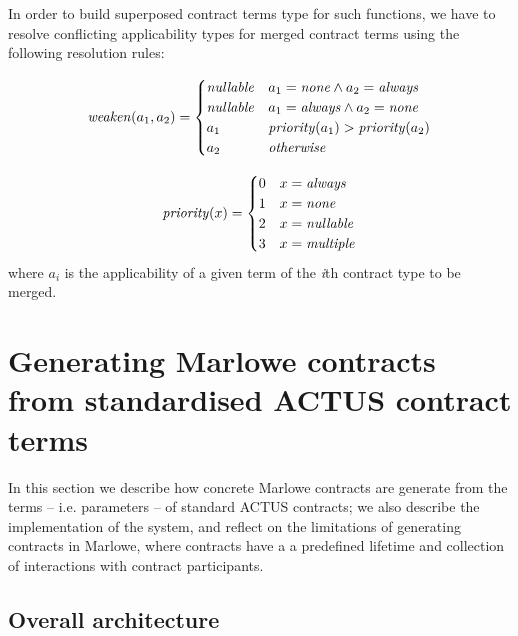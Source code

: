 \documentclass[runningheads]{llncs}
\newcommand{\ident}[1]{\mbox{\emph{#1}}}
\begin{document}
In order to build superposed contract terms type for such functions,
we have to resolve conflicting applicability types for merged contract terms
using the following resolution rules:

\noindent 
\begin{equation}
\ident{weaken}(a_{1},a_{2})=\begin{cases}
\ident{nullable} & a_{1}=\ident{none}\wedge a_{2}=\ident{always}\\
\ident{nullable} & a_{1}=\ident{always}\wedge a_{2}=\ident{none}\\
a_{1} & \ident{priority}(a_{1})>\ident{priority}(a_{2})\\
a_{2} & \ident{otherwise}
\end{cases}
\end{equation}

\noindent 
\begin{equation}
\ident{priority}(x)=\begin{cases}
0 & x=\ident{always}\\
1 & x=\ident{none}\\
2 & x=\ident{nullable}\\
3 & x=\ident{multiple}
\end{cases}
\end{equation}
\noindent
where $a_{i}$ is the applicability of a given term of the \emph{i}th contract
type to be merged.

\section{Generating Marlowe contracts from standardised ACTUS contract terms}
\label{generation}

In this section we describe how concrete Marlowe contracts are generate from the terms -- i.e. parameters -- of standard ACTUS contracts; we also describe the implementation of the system, and reflect on the limitations of generating contracts in Marlowe, where contracts have a a predefined lifetime and collection of interactions with contract participants.

\subsection{Overall architecture }
\end{document}

